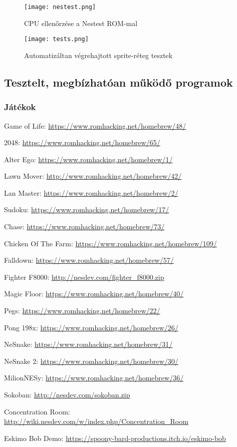 \vspace{0.2cm}
\begin{figure}[H]
	\centering
	\texttt{[image: nestest.png]}
	\caption{CPU ellenőrzése a Nestest ROM-mal}
\end{figure}


\begin{figure}[H]
	\centering
	\texttt{[image: tests.png]}
	\caption{Automatizáltan végrehajtott sprite-réteg tesztek}
\end{figure}

\subsection{Tesztelt, megbízhatóan működő programok}

\subsubsection{Játékok}
\begin{compactitem}
	\item Game of Life: \url{https://www.romhacking.net/homebrew/48/}
	\item 2048: \url{https://www.romhacking.net/homebrew/65/}
	\item Alter Ego: \url{https://www.romhacking.net/homebrew/1/} \label{alter}
	\item Lawn Mover: \url{http://www.romhacking.net/homebrew/42/} \label{lawn}
	\item Lan Master: \url{https://www.romhacking.net/homebrew/2/}
	\item Sudoku: \url{https://www.romhacking.net/homebrew/17/}
	\item Chase: \url{https://www.romhacking.net/homebrew/73/}
	\item Chicken Of The Farm: \url{https://www.romhacking.net/homebrew/109/}
	\item Falldown: \url{https://www.romhacking.net/homebrew/57/}
	\item Fighter F8000: \url{http://nesdev.com/fighter\_f8000.zip}
	\item Magic Floor: \url{https://www.romhacking.net/homebrew/40/}
	\item Pegs: \url{https://www.romhacking.net/homebrew/22/}
	\item Pong 198x: \url{https://www.romhacking.net/homebrew/26/}
	\item NeSnake: \url{https://www.romhacking.net/homebrew/31/}
	\item NeSnake 2: \url{https://www.romhacking.net/homebrew/30/}
	\item MilionNESy: \url{https://www.romhacking.net/homebrew/36/}
	\item Sokoban: \url{http://nesdev.com/sokoban.zip}
	\item Concentration Room: \newline \url{http://wiki.nesdev.com/w/index.php/Concentration_Room}
	\item Eskimo Bob Demo: \newline \url{https://spoony-bard-productions.itch.io/eskimo-bob}
\end{compactitem}

